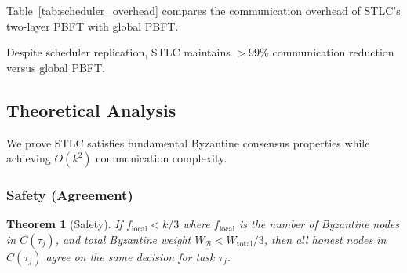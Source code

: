 \documentclass[lettersize,journal]{IEEEtran}
\newtheorem{theorem}{Theorem}
\begin{document}
Table~\ref{tab:scheduler_overhead} compares the communication overhead of
STLC's two-layer PBFT with global PBFT.

\begin{table}[h]
\centering
\caption{Communication Overhead: STLC vs. Global PBFT}
\label{tab:scheduler_overhead}
\small
{}
\end{table}

Despite scheduler replication, STLC maintains $>99\%$ communication
reduction versus global PBFT.


\subsection{Theoretical Analysis}
\label{sec:theoretical}

We prove STLC satisfies fundamental Byzantine consensus properties while
achieving $O(k^2)$ communication complexity.

\subsubsection{Safety (Agreement)}
\label{sec:safety_theorem}

\begin{theorem}[Safety]
\label{thm:safety}
If $f_{\text{local}} < k/3$ where $f_{\text{local}}$ is
the number of Byzantine nodes in $C(\tau_j)$, and total Byzantine weight
$W_{\mathcal{B}} < W_{\text{total}}/3$, then all honest nodes in
$C(\tau_j)$ agree on the same decision for task $\tau_j$.
\end{theorem}
\end{document}
